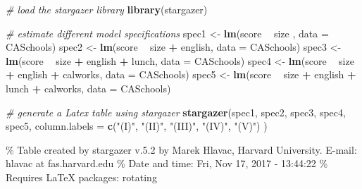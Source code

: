 \documentclass[]{book}
\newenvironment{Shaded}{\begin{snugshade}}{\end{snugshade}}
\newcommand{\KeywordTok}[1]{\textcolor[rgb]{0.13,0.29,0.53}{\textbf{#1}}}
\newcommand{\DataTypeTok}[1]{\textcolor[rgb]{0.13,0.29,0.53}{#1}}
\newcommand{\StringTok}[1]{\textcolor[rgb]{0.31,0.60,0.02}{#1}}
\newcommand{\CommentTok}[1]{\textcolor[rgb]{0.56,0.35,0.01}{\textit{#1}}}
\newcommand{\OperatorTok}[1]{\textcolor[rgb]{0.81,0.36,0.00}{\textbf{#1}}}
\newcommand{\NormalTok}[1]{#1}
\theoremstyle{definition}
\theoremstyle{definition}
\theoremstyle{definition}
\theoremstyle{remark}
\begin{document}
\begin{Shaded}
\begin{Highlighting}[]
\CommentTok{# load the stargazer library}
\KeywordTok{library}\NormalTok{(stargazer)}

\CommentTok{# estimate different model specifications}
\NormalTok{spec1 <-}\StringTok{ }\KeywordTok{lm}\NormalTok{(score }\OperatorTok{~}\StringTok{ }\NormalTok{size , }\DataTypeTok{data =}\NormalTok{ CASchools)}
\NormalTok{spec2 <-}\StringTok{ }\KeywordTok{lm}\NormalTok{(score }\OperatorTok{~}\StringTok{ }\NormalTok{size }\OperatorTok{+}\StringTok{ }\NormalTok{english, }\DataTypeTok{data =}\NormalTok{ CASchools)}
\NormalTok{spec3 <-}\StringTok{ }\KeywordTok{lm}\NormalTok{(score }\OperatorTok{~}\StringTok{ }\NormalTok{size }\OperatorTok{+}\StringTok{ }\NormalTok{english }\OperatorTok{+}\StringTok{ }\NormalTok{lunch, }\DataTypeTok{data =}\NormalTok{ CASchools)}
\NormalTok{spec4 <-}\StringTok{ }\KeywordTok{lm}\NormalTok{(score }\OperatorTok{~}\StringTok{ }\NormalTok{size }\OperatorTok{+}\StringTok{ }\NormalTok{english }\OperatorTok{+}\StringTok{ }\NormalTok{calworks, }\DataTypeTok{data =}\NormalTok{ CASchools)}
\NormalTok{spec5 <-}\StringTok{ }\KeywordTok{lm}\NormalTok{(score }\OperatorTok{~}\StringTok{ }\NormalTok{size }\OperatorTok{+}\StringTok{ }\NormalTok{english }\OperatorTok{+}\StringTok{ }\NormalTok{lunch }\OperatorTok{+}\StringTok{ }\NormalTok{calworks, }\DataTypeTok{data =}\NormalTok{ CASchools)}

\CommentTok{# generate a Latex table using stargazer}
\KeywordTok{stargazer}\NormalTok{(spec1, spec2, spec3, spec4, spec5, }
          \DataTypeTok{column.labels =} \KeywordTok{c}\NormalTok{(}\StringTok{"(I)"}\NormalTok{, }\StringTok{"(II)"}\NormalTok{, }\StringTok{"(III)"}\NormalTok{, }\StringTok{"(IV)"}\NormalTok{, }\StringTok{"(V)"}\NormalTok{)}
\NormalTok{          )}
\end{Highlighting}
\end{Shaded}

\% Table created by stargazer v.5.2 by Marek Hlavac, Harvard University.
E-mail: hlavac at fas.harvard.edu \% Date and time: Fri, Nov 17, 2017 -
13:44:22 \% Requires LaTeX packages: rotating
\end{document}
